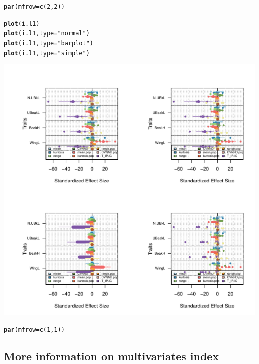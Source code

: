 \documentclass[12pt]{article}\usepackage[]{graphicx}\usepackage[]{color}
\makeatletter
\def\maxwidth{ %
  \ifdim\Gin@nat@width>\linewidth
    \linewidth
  \else
    \Gin@nat@width
  \fi
}
\newcommand{\hlnum}[1]{\textcolor[rgb]{0.686,0.059,0.569}{#1}}%
\newcommand{\hlstr}[1]{\textcolor[rgb]{0.192,0.494,0.8}{#1}}%
\newcommand{\hlstd}[1]{\textcolor[rgb]{0.345,0.345,0.345}{#1}}%
\newcommand{\hlkwc}[1]{\textcolor[rgb]{0.333,0.667,0.333}{#1}}%
\newcommand{\hlkwd}[1]{\textcolor[rgb]{0.737,0.353,0.396}{\textbf{#1}}}%
\newenvironment{kframe}{%
 \def\at@end@of@kframe{}%
 \ifinner\ifhmode%
  \def\at@end@of@kframe{\end{minipage}}%
  \begin{minipage}{\columnwidth}%
 \fi\fi%
 \def\FrameCommand##1{\hskip\@totalleftmargin \hskip-\fboxsep
 \colorbox{shadecolor}{##1}\hskip-\fboxsep
     \hskip-\linewidth \hskip-\@totalleftmargin \hskip\columnwidth}%
 \MakeFramed {\advance\hsize-\width
   \@totalleftmargin\z@ \linewidth\hsize
   \@setminipage}}%
 {\par\unskip\endMakeFramed%
 \at@end@of@kframe}
\newenvironment{knitrout}{}{} %
\makeatother
\begin{document}
\begin{knitrout}
\color{fgcolor}\begin{kframe}
\begin{alltt}
\hlkwd{par}\hlstd{(}\hlkwc{mfrow} \hlstd{=} \hlkwd{c}\hlstd{(}\hlnum{2}\hlstd{,}\hlnum{2}\hlstd{))}

\hlkwd{plot}\hlstd{(i.l1)}
\hlkwd{plot}\hlstd{(i.l1,}\hlkwc{type} \hlstd{=} \hlstr{"normal"}\hlstd{)}
\hlkwd{plot}\hlstd{(i.l1,}\hlkwc{type} \hlstd{=} \hlstr{"barplot"}\hlstd{)}
\hlkwd{plot}\hlstd{(i.l1,}\hlkwc{type} \hlstd{=} \hlstr{"simple"}\hlstd{)}
\end{alltt}
\end{kframe}
\includegraphics[width=\maxwidth]{figure/unnamed-chunk-52-1} 
\begin{kframe}\begin{alltt}
\hlkwd{par}\hlstd{(}\hlkwc{mfrow} \hlstd{=} \hlkwd{c}\hlstd{(}\hlnum{1}\hlstd{,}\hlnum{1}\hlstd{))}
\end{alltt}
\end{kframe}
\end{knitrout}



\newpage

\subsection{More information on multivariates index}
\end{document}
